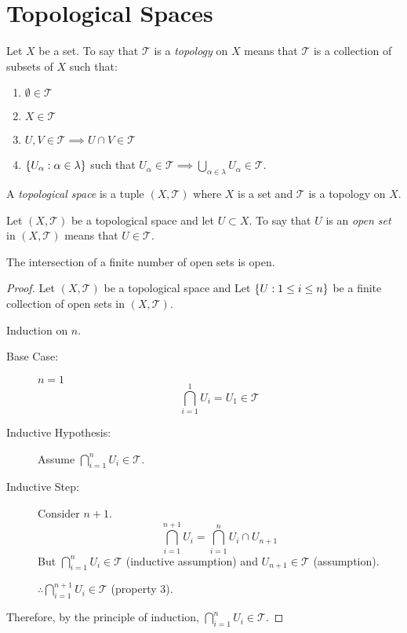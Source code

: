 \documentclass[letterpaper,12pt,fleqn]{article}
\newcommand{\T}{\mathscr{T}}
\renewcommand{\a}{\alpha}
\renewcommand{\l}{\lambda}
\begin{document}
\section*{Topological Spaces}

\begin{definition}[Topology]
  Let \(X\) be a set.  To say that \(\T\) is a \emph{topology} on \(X\) means that \(\T\) is a collection of
  subsets of \(X\) such that:
  \begin{enumerate}
  \item \(\emptyset\in\T\)
  \item \(X\in\T\)
  \item \(U,V\in\T\implies U\cap V\in\T\)
  \item \(\set{U_{\a}:\a\in\l}\) such that \(U_{\a}\in\T\implies \bigcup_{\a\in\l}U_{\a}\in\T\).
  \end{enumerate}
  A \emph{topological space} is a tuple \((X,\T)\) where \(X\) is a set and \(\T\) is a topology on \(X\).
\end{definition}

\begin{definition}
  Let \((X,\T)\) be a topological space and let \(U\subset X\).  To say that \(U\) is an \emph{open set} in
  \((X,\T)\) means that \(U\in\T\).
\end{definition}

\begin{theorem}
  The intersection of a finite number of open sets is open.
\end{theorem}

\begin{proof}
  Let \((X,\T)\) be a topological space and Let \(\{U:1\le i\le n\}\) be a finite collection of open sets in
  \((X,\T)\).

  Induction on \(n\).

  \begin{description}
  \item[Base Case:] \(n=1\)
    \[\bigcap_{i=1}^1U_i=U_1\in\T\]

  \item[Inductive Hypothesis:] Assume \(\bigcap_{i=1}^nU_i\in\T\).

  \item[Inductive Step:] Consider \(n+1\).
    \[\bigcap_{i=1}^{n+1}U_i=\bigcap_{i=1}^nU_i\cap U_{n+1}\]
    But \(\bigcap_{i=1}^nU_i\in\T\) (inductive assumption) and \(U_{n+1}\in\T\) (assumption).

    \(\therefore\bigcap_{i=1}^{n+1}U_i\in\T\) (property 3).
  \end{description}

  Therefore, by the principle of induction, \(\bigcap_{i=1}^nU_i\in\T\).
\end{proof}
\end{document}
